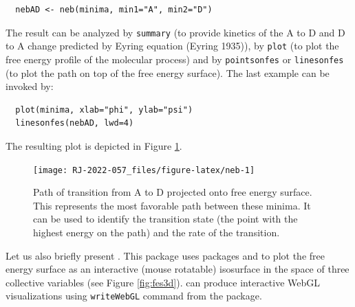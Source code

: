 \begin{verbatim}
  nebAD <- neb(minima, min1="A", min2="D")
\end{verbatim}

The result can be analyzed by \texttt{summary} (to provide kinetics
of the A to D and D to A change predicted by Eyring
equation (Eyring 1935)), by \texttt{plot} (to plot the free energy
profile of the molecular process) and by \texttt{pointsonfes}
or \texttt{linesonfes} (to plot the path on top of the free energy
surface). The last example can be invoked by:

\begin{verbatim}
  plot(minima, xlab="phi", ylab="psi")
  linesonfes(nebAD, lwd=4)
\end{verbatim}

The resulting plot is depicted in Figure \ref{fig:neb}.

\begin{figure}

{\centering \texttt{[image: RJ-2022-057\_files/figure-latex/neb-1]} 

}

\caption{Path of transition from A to D projected onto free energy surface. This represents the most favorable path between these minima. It can be used to identify the transition state (the point with the highest energy on the path) and the rate of the transition.}\label{fig:neb}
\end{figure}

Let us also briefly present . This package uses
packages  and  to plot the free energy surface as
an interactive (mouse rotatable) isosurface in the space of three collective variables (see
Figure \ref{fig:fes3d}).  can produce interactive WebGL visualizations
using \texttt{writeWebGL} command from the  package.

